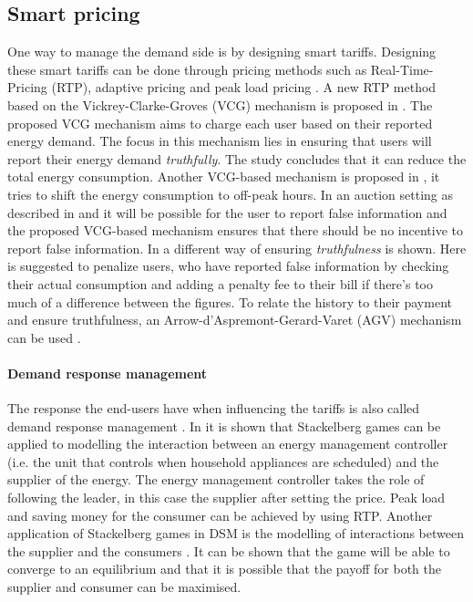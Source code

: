 \subsection{Smart pricing}
One way to manage the demand side is by designing smart tariffs. Designing these smart tariffs can be done through pricing methods such as Real-Time-Pricing (RTP), adaptive pricing and peak load pricing \cite{SamadiMohsenian-RadSchoberEtAl2012}. A new RTP method based on the Vickrey-Clarke-Groves (VCG) mechanism is proposed in \cite{SamadiMohsenian-RadSchoberEtAl2012}. The proposed VCG mechanism aims to charge each user based on their reported energy demand. The focus in this mechanism lies in ensuring that users will report their energy demand \textit{truthfully}. The study concludes that it can reduce the total energy consumption. Another VCG-based mechanism is proposed in \cite{SamadiSchoberWong2011}, it tries to shift the energy consumption to off-peak hours. In an auction setting as described in \cite{SamadiMohsenian-RadSchoberEtAl2012} and \cite{SamadiSchoberWong2011} it will be possible for the user to report false information and the proposed VCG-based mechanism ensures that there should be no incentive to report false information. In \cite{MaDengSongEtAl2014} a different way of ensuring \textit{truthfulness} is shown. Here is suggested to penalize users, who have  reported false information by checking their actual consumption and adding a penalty fee to their bill if there's too much of a difference between the figures. To relate the history to their payment and ensure truthfulness, an Arrow-d'Aspremont-Gerard-Varet (AGV) mechanism can be used \cite{MaDengSongEtAl2014}.

\paragraph{Demand response management}
The response the end-users have when influencing the tariffs is also called demand response management \cite{MaharjanZhuZhangEtAl2013}.
In \cite{ChenKishoreSnyder2011} it is shown that Stackelberg games can be applied to modelling the interaction between an energy management controller (i.e. the unit that controls when household appliances are scheduled) and the supplier of the energy. The energy management controller takes the role of following the leader, in this case the supplier after setting the price. Peak load and saving money for the consumer can be achieved by using RTP. Another application of Stackelberg games in DSM is the modelling of interactions between the supplier and the consumers \cite{MaharjanZhuZhangEtAl2013}. It can be shown that the game will be able to converge to an equilibrium and that it is possible that the payoff for both the supplier and consumer can be maximised. 

